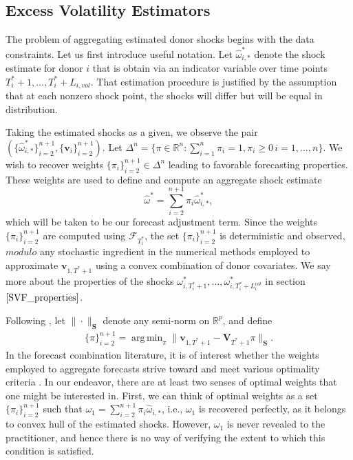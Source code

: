 \documentclass[11pt,3p,review,authoryear]{elsarticle}
\newcommand{\weight}{\pi}
\newcommand{\x}{\textbf{v}}
\newcommand{\V}{\textbf{V}}
\DeclareMathOperator*{\argmin}{arg\,min} %
\theoremstyle{definition}
\begin{document}
\subsection{Excess Volatility Estimators}
    \label{Excess Volatility Estimators}
   
    The problem of aggregating estimated donor shocks begins with the data constraints.  Let us first introduce useful notation.  Let $\hat\omega^{*}_{i,*}$ denote the shock estimate for donor $i$ that is obtain via an indicator variable over time points $T_{i}^{*}+1,...,T_{i}^{*}+L_{i,vol}$.  That estimation procedure is justified by the assumption that at each nonzero shock point, the shocks will differ but will be equal in distribution.  
    
    Taking the estimated shocks as a given, we observe the pair $(\{\hat\omega^{*}_{i,*}\}^{n+1}_{i=2},\{\textbf{v}_{i}\}^{n+1}_{i=2})$.  Let $\Delta^{n} = \{\pi \in \mathbb{R}^n: \sum_{i=1}^n \pi_i = 1, \pi_i \geq 0 \, i = 1,...,n\}$.  We wish to recover weights $\{\weight_{i}\}^{n+1}_{i=2} \in \Delta^{n}$ leading to favorable forecasting properties.  These weights are used to define and compute an aggregate shock estimate 
\begin{equation} \label{adjustment}
	  \hat\omega^{*} = \sum^{n+1}_{i=2}\weight_{i}\hat\omega^{*}_{i,*},
\end{equation}
    which will be taken to be our forecast adjustment term.  Since the weights $\{\weight_{i}\}_{i=2}^{n+1}$ are computed using $\mathcal{F}_{T^{*}_{i}}$, the set $\{\weight_{i}\}_{i=2}^{n+1}$ is deterministic and observed, $\textit{modulo}$ any stochastic ingredient in the numerical methods employed to approximate $\x_{1,T^{*}+1}$ using a convex combination of donor covariates.  We say more about the properties of the shocks $\omega^{*}_{i,T_{i}^{*}+1},...,\omega^{*}_{i,T_{i}^{*}+L^{vol}_{i}}$ in section $\ref{SVF_properties}$. 

    Following \citet{abadie2003economic,abadie2010synthetic,lin2021minimizing}, let $\|\cdot\|_{\textbf{S}}$ denote any semi-norm on $\mathbb{R}^{p}$, and define
    \begin{align*}
    \{\pi\}_{i=2}^{n+1} = \argmin_{\pi}\|\x_{1,T^* + 1} - \V_{T^* + 1}\pi\|_{\textbf{S}}. 
    \end{align*}
In the forecast combination literature, it is of interest whether the weights employed to aggregate forecasts strive toward and meet various optimality criteria \citep{timmermann2006forecast,wang2023forecast}.  In our endeavor, there are at least two senses of optimal weights that one might be interested in.  First, we can think of optimal weights as a set $\{\weight_{i}\}_{i=2}^{n+1}$ such that $\omega_{1} = \sum^{n+1}_{i=2}\weight_{i}\hat\omega_{i,*}$, i.e., $\omega_{1}$ is recovered perfectly, as it belongs to convex hull of the estimated shocks. However, $\omega_{1}$ is never revealed to the practitioner, and hence there is no way of verifying the extent to which this condition is satisfied.
\end{document}
